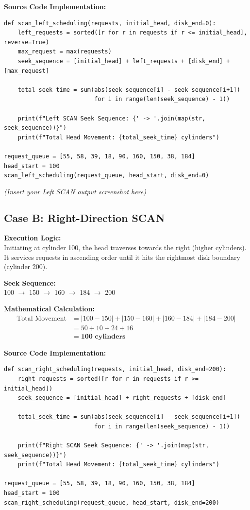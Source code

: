 \documentclass[12pt,a4paper]{article}
\begin{document}
\textbf{Source Code Implementation:}
\begin{lstlisting}
def scan_left_scheduling(requests, initial_head, disk_end=0):
    left_requests = sorted([r for r in requests if r <= initial_head], reverse=True)
    max_request = max(requests)
    seek_sequence = [initial_head] + left_requests + [disk_end] + [max_request]
    
    total_seek_time = sum(abs(seek_sequence[i] - seek_sequence[i+1]) 
                          for i in range(len(seek_sequence) - 1))
                          
    print(f"Left SCAN Seek Sequence: {' -> '.join(map(str, seek_sequence))}")
    print(f"Total Head Movement: {total_seek_time} cylinders")

request_queue = [55, 58, 39, 18, 90, 160, 150, 38, 184]
head_start = 100
scan_left_scheduling(request_queue, head_start, disk_end=0)
\end{lstlisting}

\textit{(Insert your Left SCAN output screenshot here)}

\vspace{0.5cm}

\subsection*{Case B: Right-Direction SCAN}
\textbf{Execution Logic:} \\
Initiating at cylinder 100, the head traverses towards the right (higher cylinders). It services requests in ascending order until it hits the rightmost disk boundary (cylinder 200).

\textbf{Seek Sequence:} \\
100 $\rightarrow$ 150 $\rightarrow$ 160 $\rightarrow$ 184 $\rightarrow$ 200

\textbf{Mathematical Calculation:}
\begin{align*}
\text{Total Movement} &= |100 - 150| + |150 - 160| + |160 - 184| + |184 - 200| \\
&= 50 + 10 + 24 + 16 \\
&= \mathbf{100 \text{ cylinders}}
\end{align*}

\textbf{Source Code Implementation:}
\begin{lstlisting}
def scan_right_scheduling(requests, initial_head, disk_end=200):
    right_requests = sorted([r for r in requests if r >= initial_head])
    seek_sequence = [initial_head] + right_requests + [disk_end]
    
    total_seek_time = sum(abs(seek_sequence[i] - seek_sequence[i+1]) 
                          for i in range(len(seek_sequence) - 1))
                          
    print(f"Right SCAN Seek Sequence: {' -> '.join(map(str, seek_sequence))}")
    print(f"Total Head Movement: {total_seek_time} cylinders")

request_queue = [55, 58, 39, 18, 90, 160, 150, 38, 184]
head_start = 100
scan_right_scheduling(request_queue, head_start, disk_end=200)
\end{lstlisting}
\end{document}
